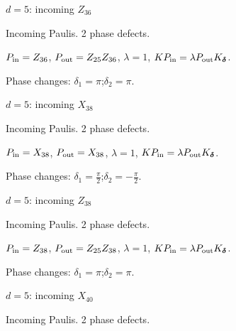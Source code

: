 {\Large $d=5$: incoming $Z_{36}$}\par
Incoming Paulis. 2 phase defects.
\begin{center}
\end{center}
\vspace{-1mm}
$P_{\rm in}=Z_{36}$, \quad $P_{\rm out}=Z_{25}Z_{36}$, \quad $\lambda=1$, \qquad $K P_{\rm in}=\lambda P_{\rm out}K_{\boldsymbol\delta}$.
\par\smallskip\begin{minipage}{.98\linewidth}\small Phase changes: $\delta_{1}=\pi$;\quad $\delta_{2}=\pi$.\end{minipage}
\vfill
{\footnotesize\texttt{}}
\newpage
{}
{\Large $d=5$: incoming $X_{38}$}\par
Incoming Paulis. 2 phase defects.
\begin{center}
\end{center}
\vspace{-1mm}
$P_{\rm in}=X_{38}$, \quad $P_{\rm out}=X_{38}$, \quad $\lambda=1$, \qquad $K P_{\rm in}=\lambda P_{\rm out}K_{\boldsymbol\delta}$.
\par\smallskip\begin{minipage}{.98\linewidth}\small Phase changes: $\delta_{1}=\frac{\pi}{2}$;\quad $\delta_{2}=-\frac{\pi}{2}$.\end{minipage}
\vfill
{\footnotesize\texttt{}}
\newpage
{}
{\Large $d=5$: incoming $Z_{38}$}\par
Incoming Paulis. 2 phase defects.
\begin{center}
\end{center}
\vspace{-1mm}
$P_{\rm in}=Z_{38}$, \quad $P_{\rm out}=Z_{25}Z_{38}$, \quad $\lambda=1$, \qquad $K P_{\rm in}=\lambda P_{\rm out}K_{\boldsymbol\delta}$.
\par\smallskip\begin{minipage}{.98\linewidth}\small Phase changes: $\delta_{1}=\pi$;\quad $\delta_{2}=\pi$.\end{minipage}
\vfill
{\footnotesize\texttt{}}
\newpage
{}
{\Large $d=5$: incoming $X_{40}$}\par
Incoming Paulis. 2 phase defects.
\begin{center}
\end{center}
